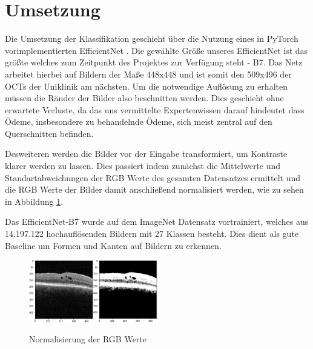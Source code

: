 \section{Umsetzung}

Die Umsetzung der Klassifikation geschieht über die Nutzung eines in PyTorch vorimplementierten EfficientNet \cite{22}. Die gewählte Größe unseres EfficientNet ist das größte welches zum Zeitpunkt des Projektes zur Verfügung steht - B7.  Das Netz arbeitet hierbei auf Bildern der Maße 448x448 und ist somit den 509x496 der OCTs der Uniklinik am nächsten. Um die notwendige Auflösung zu erhalten müssen die Ränder der Bilder also beschnitten werden. Dies geschieht ohne erwartete Verluste, da das uns vermittelte Expertenwissen darauf hindeutet dass Ödeme, insbesondere zu behandelnde Ödeme, sich meist zentral auf den Querschnitten befinden.

Desweiteren werden die Bilder vor der Eingabe transformiert, um Kontraste klarer werden zu lassen. Dies passiert indem zunächst die Mittelwerte und Standartabweichungen der RGB Werte des gesamten Datensatzes ermittelt und die RGB Werte der Bilder damit anschließend normalisiert werden, wie zu sehen in Abbildung \ref{pic:Norm}.

Das EfficientNet-B7 wurde auf dem ImageNet Datensatz vortrainiert, welches aus 14.197.122 hochauflösenden Bildern mit 27 Klassen besteht. Dies dient als gute Baseline um Formen und Kanten auf Bildern zu erkennen.

\begin{figure}[H]
\centering
\includegraphics[width=0.25\textwidth]{./pic/Klassifikation/regular_image.png}\hspace{0.5cm}\includegraphics[width=0.25\textwidth]{./pic/Klassifikation/normalized_image.png}
\caption{\label{pic:Norm}Normalisierung der RGB Werte}
\end{figure}

